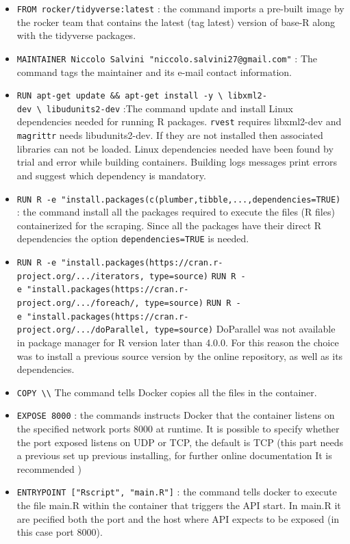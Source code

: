 \documentclass[
  12pt,
  a4paper,
  oneside]{book}
\theoremstyle{definition}
\theoremstyle{definition}
\theoremstyle{definition}
\theoremstyle{remark}
\begin{document}
\begin{itemize}
\item
  \texttt{FROM\ rocker/tidyverse:latest} : the command imports a pre-built image by the rocker team that contains the latest (tag latest) version of base-R along with the tidyverse packages.
\item
  \texttt{MAINTAINER\ Niccolo\ Salvini\ "niccolo.salvini27@gmail.com"} : The command tags the maintainer and its e-mail contact information.
\item
  \texttt{RUN\ apt-get\ update\ \&\&\ apt-get\ install\ -y\ \textbackslash{}\ libxml2-dev\ \textbackslash{}\ libudunits2-dev} :The command update and install Linux dependencies needed for running R packages. \texttt{rvest} requires libxml2-dev and \texttt{magrittr} needs libudunits2-dev. If they are not installed then associated libraries can not be loaded. Linux dependencies needed have been found by trial and error while building containers. Building logs messages print errors and suggest which dependency is mandatory.
\item
  \texttt{RUN\ R\ -e\ "install.packages(c(\textquotesingle{}plumber\textquotesingle{},\textquotesingle{}tibble\textquotesingle{},\textquotesingle{}...\textquotesingle{},dependencies=TRUE)} : the command install all the packages required to execute the files (R files) containerized for the scraping. Since all the packages have their direct R dependencies the option \texttt{dependencies=TRUE} is needed.
\item
  \texttt{RUN\ R\ -e\ "install.packages(\textquotesingle{}https://cran.r-project.org/.../iterators,\ type=\textquotesingle{}source\textquotesingle{})}
  \texttt{RUN\ R\ -e\ "install.packages(\textquotesingle{}https://cran.r-project.org/.../foreach/,\ type=\textquotesingle{}source\textquotesingle{})}
  \texttt{RUN\ R\ -e\ "install.packages(\textquotesingle{}https://cran.r-project.org/.../doParallel,\ type=\textquotesingle{}source\textquotesingle{})}
  DoParallel was not available in package manager for R version later than 4.0.0. For this reason the choice was to install a previous source version by the online repository, as well as its dependencies.
\item
  \texttt{COPY\ \textbackslash{}\textbackslash{}} The command tells Docker copies all the files in the container.
\item
  \texttt{EXPOSE\ 8000} : the commands instructs Docker that the container listens on the specified network ports 8000 at runtime. It is possible to specify whether the port exposed listens on UDP or TCP, the default is TCP (this part needs a previous set up previous installing, for further online documentation It is recommended \citep{docker_documentation_2020} )
\item
  \texttt{ENTRYPOINT\ {[}"Rscript",\ "main.R"{]}} : the command tells docker to execute the file main.R within the container that triggers the API start. In main.R it are pecified both the port and the host where API expects to be exposed (in this case port 8000).
\end{itemize}
\end{document}
